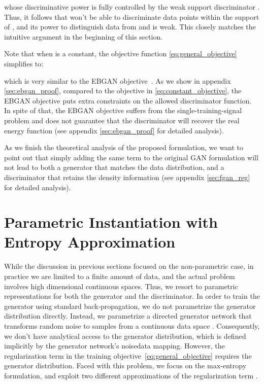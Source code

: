 \documentclass[a4paper]{article}
\begin{document}
\begin{enumerate}[leftmargin=16pt,labelindent=16pt]
whose discriminative power is fully controlled by the weak support discriminator . 
Thus, it follows that  won't be able to discriminate data points within the support of , and its power to distinguish data from  and  is weak.
This closely matches the intuitive argument in the beginning of this section.





Note that when  is a constant, the objective function \eqref{eq:general_objective} simplifies to: 

which is very similar to the EBGAN objective~\citep[equation (2) and (4)]{zhao2016energy}.
As we show in appendix \ref{sec:ebgan_proof}, compared to the objective in \eqref{eq:constant_objective}, the EBGAN objective puts extra constraints on the allowed discriminator function.
In spite of that, the EBGAN objective suffers from the single-training-signal problem and does not guarantee that the discriminator will recover the real energy function (see appendix \ref{sec:ebgan_proof} for detailed analysis).
\end{enumerate}

As we finish the theoretical analysis of the proposed formulation, we want to point out that simply adding the same term  to the original GAN formulation will not lead to both a generator that matches the data distribution, and a discriminator that retains the density information (see appendix \ref{sec:fgan_reg} for detailed analysis).
 \section{Parametric Instantiation with Entropy Approximation}
\label{sec:instantiation}
While the discussion in previous sections focused on the non-parametric case, in practice we are limited to a finite amount of data, and the actual problem involves high dimensional continuous spaces.
Thus, we resort to parametric representations for both the generator and the discriminator.
In order to train the generator using standard back-propagation, we do not parametrize the generator distribution directly. Instead, we parametrize a directed generator network that transforms random noise  to samples from a continuous data space .
Consequently, we don't have analytical access to the generator distribution, which is defined implicitly by the generator network's noisedata mapping.
However, the regularization term  in the training objective~\eqref{eq:general_objective} requires the generator distribution.
Faced with this problem, we focus on the max-entropy formulation, and exploit two different approximations of the regularization term .
\end{document}

